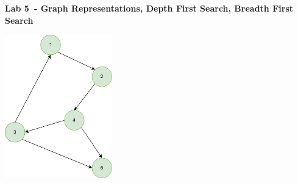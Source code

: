 \documentclass{exam}
\newcommand\labnr{5}
\newcommand\lab{Lab \labnr\ - Graph Representations, Depth First Search, Breadth First Search}
\begin{document}
\begin{center}
    \vspace*{0cm}
    \bfseries\LARGE
    \lab
    \vspace*{1cm}
\end{center}

\begin{center}
\includegraphics[width=0.35\textwidth]{diagrams/digraph0.drawio.png}
\end{center}
\end{document}
